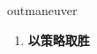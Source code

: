 
\begin{frame}
{\huge outmaneuver}
\begin{center}
\begin{enumerate}\Large
  \item \textbf{以策略取胜}
\end{enumerate}
\end{center}
\end{frame}
